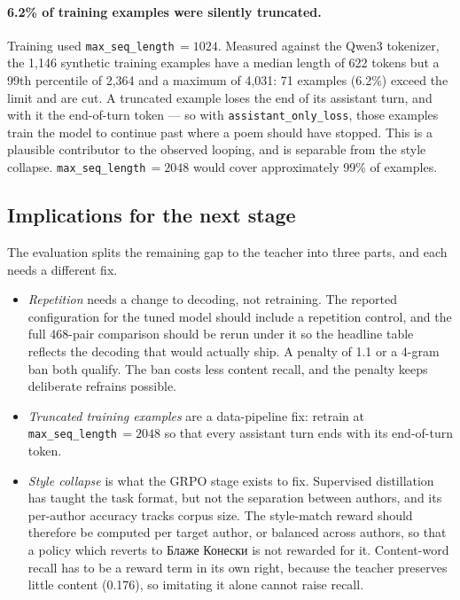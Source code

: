 \documentclass[11pt]{article}
\begin{document}
\paragraph{6.2\% of training examples were silently truncated.} Training used
\texttt{max\_seq\_length}\,$=1024$. Measured against the Qwen3 tokenizer, the
1{,}146 synthetic training examples have a median length of 622 tokens but a
99th percentile of 2{,}364 and a maximum of 4{,}031: 71 examples (6.2\%)
exceed the limit and are cut. A truncated example loses the end of its
assistant turn, and with it the end-of-turn token --- so with
\texttt{assistant\_only\_loss}, those examples train the model to continue
past where a poem should have stopped. This is a plausible contributor to the
observed looping, and is separable from the style collapse.
\texttt{max\_seq\_length}\,$=2048$ would cover approximately 99\% of examples.

\subsection{Implications for the next stage}

The evaluation splits the remaining gap to the teacher into three parts, and
each needs a different fix.

\begin{itemize}
  \item \emph{Repetition} needs a change to decoding, not retraining. The
    reported configuration for the tuned model should include a repetition
    control, and the full 468-pair comparison should be rerun under it so the
    headline table reflects the decoding that would actually ship. A penalty
    of 1.1 or a 4-gram ban both qualify. The ban costs less content recall,
    and the penalty keeps deliberate refrains possible.
  \item \emph{Truncated training examples} are a data-pipeline fix: retrain
    at \texttt{max\_seq\_length}\,$=2048$ so that every assistant turn ends
    with its end-of-turn token.
  \item \emph{Style collapse} is what the GRPO stage exists to fix. Supervised
    distillation has taught the task format, but not the separation between
    authors, and its per-author accuracy tracks corpus size. The style-match
    reward should therefore be computed per target author, or balanced across
    authors, so that a policy which reverts to Блаже Конески is not rewarded
    for it. Content-word recall has to be a reward term in its own right,
    because the teacher preserves little content (0.176), so imitating it
    alone cannot raise recall.
\end{itemize}
\end{document}
